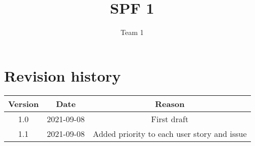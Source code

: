 \documentclass{article}
\title{SPF 1}
\author{Team 1}
\begin{document}
\date{}
\maketitle
\thispagestyle{fancy}

\section*{Revision history}
\begin{tabular}{ |c|c|c| } 
 \hline
 Version & Date & Reason \\ \hline
 1.0 & 2021-09-08 & First draft \\ 
 \hline
 1.1 & 2021-09-08 & Added priority to each user story and issue \\ 
 \hline
\end{tabular}

\newpage
\end{document}
